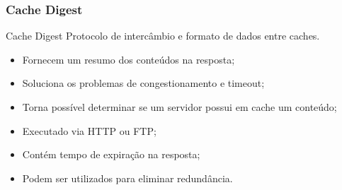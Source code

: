 \subsubsection{Cache Digest}
\label{section:Cache Digest}
Cache Digest
Protocolo de interc\^ambio e formato de dados entre caches.
\begin{itemize}
\item Fornecem um resumo dos conte\'udos na resposta;
\item Soluciona os problemas de congestionamento e timeout;
\item Torna poss\'ivel determinar se um servidor possui em cache um conte\'udo;
\item Executado via HTTP ou FTP;
\item Cont\'em tempo de expira\c{c}\~ao na resposta;
\item Podem ser utilizados para eliminar redund\^ancia.
\end{itemize}
